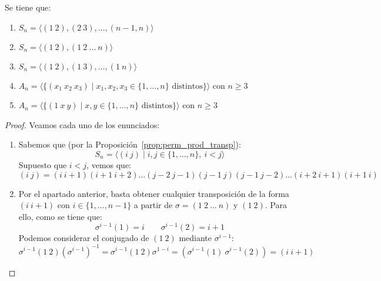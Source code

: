\begin{prop}\label{prop:generadores_grupos}
    Se tiene que:
    \begin{enumerate}[label=(\alph*)]
        \item $S_n = \langle (1\ 2),(2\ 3),\ldots,(n-1, n) \rangle $
        \item $S_n = \langle (1\ 2), (1\ 2\ \ldots\ n) \rangle $
        \item $S_n = \langle (1\ 2),(1\ 3), \ldots, (1\ n)\rangle $
        \item $A_n = \langle \{(x_1\ x_2\ x_3) \mid x_1,x_2,x_3 \in \{1,\ldots,n\} \text{\ distintos}\} \rangle $ con $n\geq 3$
        \item $A_n = \langle \{(1\ x\ y) \mid x,y\in \{1,\ldots,n\} \text{\ distintos}\} \rangle $ con $n\geq 3$
    \end{enumerate}
    \begin{proof}
        Veamos cada uno de los enunciados:
        \begin{enumerate}[label=(\alph*)]
            \item Sabemos que (por la Proposición~\ref{prop:perm_prod_transp}):
                \begin{equation*}
                    S_n = \langle (i\ j) \mid i,j \in \{1,\ldots,n\},\ i<j \rangle 
                \end{equation*}
                Supuesto que $i<j$, vemos que:
                \begin{equation*}
                    (i\ j) = (i\ i+1)(i+1\ i+2) \ldots (j-2\ j-1)(j-1\ j)(j-1\ j-2) \ldots (i+2\ i+1)(i+1\ i)
                \end{equation*}
            \item Por el apartado anterior, basta obtener cualquier transposición de la forma $(i\ i+1)$ con $i \in \{1,\ldots,n-1\}$ a partir de $\sigma=(1\ 2\ \ldots\ n)$ y $(1\ 2)$. Para ello, como se tiene que:
                \begin{equation*}
                    \sigma^{i-1}(1) = i \qquad \sigma^{i-1}(2) = i+1 
                \end{equation*}
                Podemos considerar el conjugado de $(1\ 2)$ mediante $\sigma^{i-1}$:
                \begin{equation*}
                    \sigma^{i-1}(1\ 2){(\sigma^{i-1})}^{-1} = \sigma^{i-1}(1\ 2)\sigma^{1-i} = (\sigma^{i-1}(1)\ \sigma^{i-1}(2)) = (i\ i+1)
                \end{equation*}

\end{enumerate}
\end{proof}
\end{prop}
